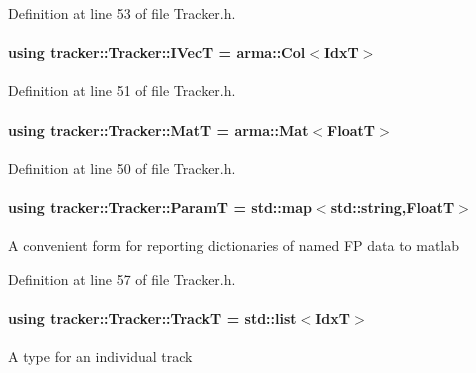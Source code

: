 Definition at line 53 of file Tracker.\+h.

\paragraph[{\texorpdfstring{I\+VecT}{IVecT}}]{\setlength{\rightskip}{0pt plus 5cm}using {\bf tracker\+::\+Tracker\+::\+I\+VecT} =  arma\+::\+Col$<${\bf IdxT}$>$}\hypertarget{classtracker_1_1Tracker_a59a6e01be987f9c0093a8ac5ad97ce33}{}\label{classtracker_1_1Tracker_a59a6e01be987f9c0093a8ac5ad97ce33}


Definition at line 51 of file Tracker.\+h.

\paragraph[{\texorpdfstring{MatT}{MatT}}]{\setlength{\rightskip}{0pt plus 5cm}using {\bf tracker\+::\+Tracker\+::\+MatT} =  arma\+::\+Mat$<${\bf FloatT}$>$}\hypertarget{classtracker_1_1Tracker_a60a1d6ee07284ba82f0533c79311ccfd}{}\label{classtracker_1_1Tracker_a60a1d6ee07284ba82f0533c79311ccfd}


Definition at line 50 of file Tracker.\+h.

\paragraph[{\texorpdfstring{ParamT}{ParamT}}]{\setlength{\rightskip}{0pt plus 5cm}using {\bf tracker\+::\+Tracker\+::\+ParamT} =  std\+::map$<$std\+::string,{\bf FloatT}$>$}\hypertarget{classtracker_1_1Tracker_a5fd443ec1139ed82910dd16316100db7}{}\label{classtracker_1_1Tracker_a5fd443ec1139ed82910dd16316100db7}
A convenient form for reporting dictionaries of named FP data to matlab 

Definition at line 57 of file Tracker.\+h.

\paragraph[{\texorpdfstring{TrackT}{TrackT}}]{\setlength{\rightskip}{0pt plus 5cm}using {\bf tracker\+::\+Tracker\+::\+TrackT} =  std\+::list$<${\bf IdxT}$>$}\hypertarget{classtracker_1_1Tracker_ac1b06aee1b9d85fb75cf6a9579eb0e84}{}\label{classtracker_1_1Tracker_ac1b06aee1b9d85fb75cf6a9579eb0e84}
A type for an individual track 

